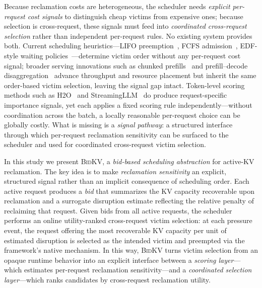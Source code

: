 \documentclass[conference]{IEEEtran}
\newcommand{\bidkv}{\textsc{BidKV}\xspace}
\begin{document}
Because reclamation costs are heterogeneous, the scheduler needs
\emph{explicit per-request cost signals} to distinguish cheap victims from
expensive ones; because selection is cross-request, these signals must feed
into \emph{coordinated cross-request selection} rather than independent
per-request rules.  No existing system provides both.  Current scheduling
heuristics---LIFO preemption~\cite{Kwon2023}, FCFS
admission~\cite{Yu2022}, EDF-style waiting
policies~\cite{Gujarati2020}---determine victim order without any
per-request cost signal; broader serving innovations such as chunked
prefills~\cite{Agrawal2024sarathiserve} and prefill--decode
disaggregation~\cite{Zhong2024, Patel2024} advance throughput and resource
placement but inherit the same order-based victim selection, leaving the
signal gap intact.  Token-level scoring methods such as
H2O~\cite{Zhang2023h2o} and StreamingLLM~\cite{Xiao2024} do produce
request-specific importance signals, yet each applies a fixed scoring rule
independently---without coordination across the batch, a locally reasonable
per-request choice can be globally costly.  What is missing is a
\emph{signal pathway}: a structured interface through which per-request
reclamation sensitivity can be surfaced to the scheduler and used for
coordinated cross-request victim selection.

In this study we present \bidkv, a \emph{bid-based scheduling abstraction} for
active-KV reclamation.  The key idea is to make \emph{reclamation sensitivity} an
explicit, structured signal rather than an implicit consequence of scheduling
order.  Each active request produces a \emph{bid} that summarizes the KV
capacity recoverable upon reclamation and a surrogate disruption estimate
reflecting the relative penalty of reclaiming that request.  Given bids from all active requests, the scheduler performs an online
utility-ranked cross-request victim selection: at each pressure event, the
request offering the most recoverable KV capacity per unit of estimated
disruption is selected as the intended victim and preempted via the
framework's native mechanism.  In this way, \bidkv turns victim
selection from an opaque runtime behavior into an explicit interface between a
\emph{scoring layer}---which estimates per-request reclamation
sensitivity---and a \emph{coordinated selection layer}---which ranks candidates by
cross-request reclamation utility.
\end{document}
